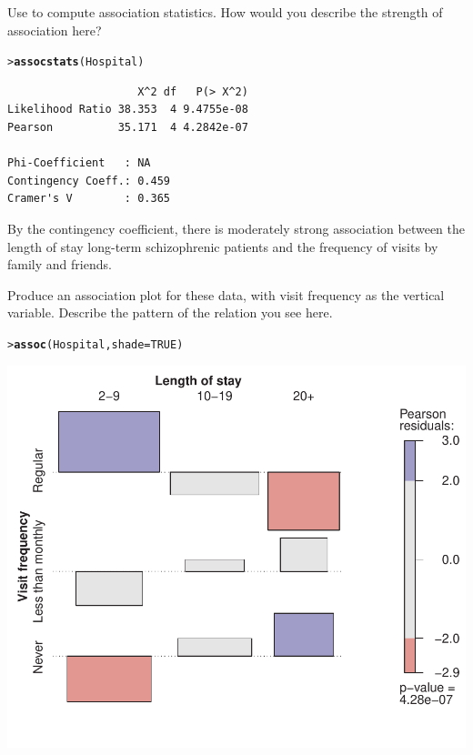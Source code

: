 \documentclass[10pt]{report}\usepackage[]{graphicx}\usepackage[]{color}
\makeatletter
\newcommand{\hlnum}[1]{\textcolor[rgb]{0.686,0.059,0.569}{#1}}%
\newcommand{\hlstd}[1]{\textcolor[rgb]{0.345,0.345,0.345}{#1}}%
\newcommand{\hlkwc}[1]{\textcolor[rgb]{0.333,0.667,0.333}{#1}}%
\newcommand{\hlkwd}[1]{\textcolor[rgb]{0.737,0.353,0.396}{\textbf{#1}}}%
\newenvironment{kframe}{%
 \def\at@end@of@kframe{}%
 \ifinner\ifhmode%
  \def\at@end@of@kframe{\end{minipage}}%
  \begin{minipage}{\columnwidth}%
 \fi\fi%
 \def\FrameCommand##1{\hskip\@totalleftmargin \hskip-\fboxsep
 \colorbox{shadecolor}{##1}\hskip-\fboxsep
     \hskip-\linewidth \hskip-\@totalleftmargin \hskip\columnwidth}%
 \MakeFramed {\advance\hsize-\width
   \@totalleftmargin\z@ \linewidth\hsize
   \@setminipage}}%
 {\par\unskip\endMakeFramed%
 \at@end@of@kframe}
\newenvironment{knitrout}{}{} %
\renewenvironment{knitrout}{\small\renewcommand{\baselinestretch}{.85}}{} %
\makeatother
\begin{document}
\begin{Exercises}
\begin{enumerate*}
      \item Use  to compute association statistics.
      How would you describe the strength of association here?
      \begin{ans}
\begin{knitrout}\footnotesize
{}\color{fgcolor}\begin{kframe}
\begin{alltt}
\hlstd{> }\hlkwd{assocstats}\hlstd{(Hospital)}
\end{alltt}
\begin{verbatim}
                    X^2 df   P(> X^2)
Likelihood Ratio 38.353  4 9.4755e-08
Pearson          35.171  4 4.2842e-07

Phi-Coefficient   : NA 
Contingency Coeff.: 0.459 
Cramer's V        : 0.365 
\end{verbatim}
\end{kframe}
\end{knitrout}
      By the contingency coefficient, there is moderately strong association between the length
      of stay long-term schizophrenic patients and the frequency of visits by family and friends.
      \end{ans}
      
      \item Produce an association plot for these data, with
      visit frequency as the vertical variable.  Describe the
      pattern of the relation you see here.
      \begin{ans}
\begin{knitrout}\footnotesize
{}\color{fgcolor}\begin{kframe}
\begin{alltt}
\hlstd{> }\hlkwd{assoc}\hlstd{(Hospital,} \hlkwc{shade}\hlstd{=}\hlnum{TRUE}\hlstd{)}
\end{alltt}
\end{kframe}

\centerline{\includegraphics[width=.5\textwidth]{soln/fig/ex4_4c-1} }




\end{knitrout}
\end{ans}
\end{enumerate*}
\end{Exercises}
\end{document}
